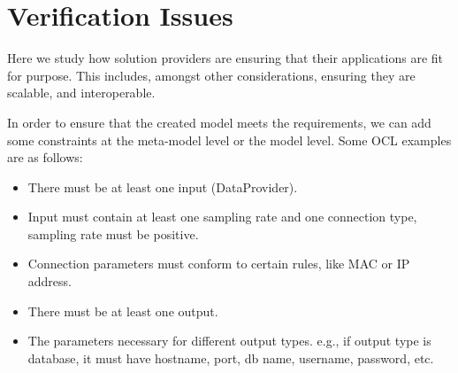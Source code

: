 \documentclass[11pt, oneside]{article}   	%
\begin{document}
\section {Veriﬁcation Issues}
\indent \par Here we study how solution providers are ensuring that their applications are ﬁt for purpose. This includes, amongst other considerations, ensuring they are scalable, and interoperable.

\indent \par In order to ensure that the created model meets the requirements, we can add some constraints at the meta-model level or the model level. Some OCL examples are as follows:
\begin{itemize}
\item There must be at least one input (DataProvider).
\item Input must contain at least one sampling rate and one connection type, sampling rate must be positive. 
\item Connection parameters must conform to certain rules, like MAC or IP address.
\item There must be at least one output.
\item The parameters necessary for different output types. e.g., if output type is database, it must have hostname, port, db name, username, password, etc.
\end{itemize}
\end{document}
